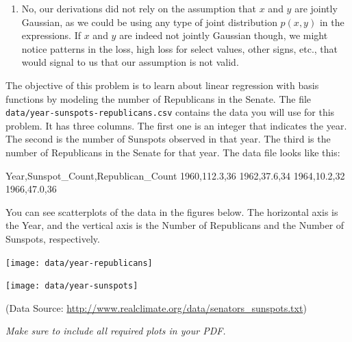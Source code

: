 \documentclass[submit]{harvardml}
\begin{document}
\begin{enumerate}
    \item No, our derivations did not rely on the assumption that $x$ and $y$ are jointly Gaussian, as we could be using any type of joint distribution $p(x,y)$ in the expressions. If $x$ and $y$ are indeed not jointly Gaussian though, we might notice patterns in the loss, high loss for select values, other signs, etc., that would signal to us that our assumption is not valid.
\end{enumerate}



\begin{problem}

 The objective of this problem is to learn about linear regression
 with basis functions by modeling the number of Republicans in the
 Senate. The file \verb|data/year-sunspots-republicans.csv| contains the
 data you will use for this problem.  It has three columns.  The first
 one is an integer that indicates the year.  The second is the number
 of Sunspots observed in that year.  The third is the number of Republicans in the Senate for that year.
 The data file looks like this:
 \begin{csv}
Year,Sunspot_Count,Republican_Count
1960,112.3,36
1962,37.6,34
1964,10.2,32
1966,47.0,36
\end{csv}

You can see scatterplots of the data in the figures below.  The horizontal axis is the Year, and the vertical axis is the Number of Republicans and the Number of Sunspots, respectively.

\begin{center}
\texttt{[image: data/year-republicans]}
\end{center}

\begin{center}
\texttt{[image: data/year-sunspots]}
\end{center}

(Data Source: \url{http://www.realclimate.org/data/senators_sunspots.txt})\\
\vspace{-5mm}


\vspace{0.5cm}
\noindent\emph{Make sure to include all required plots in your PDF.}

\begin{enumerate}


\end{enumerate}
\end{problem}
\end{document}
